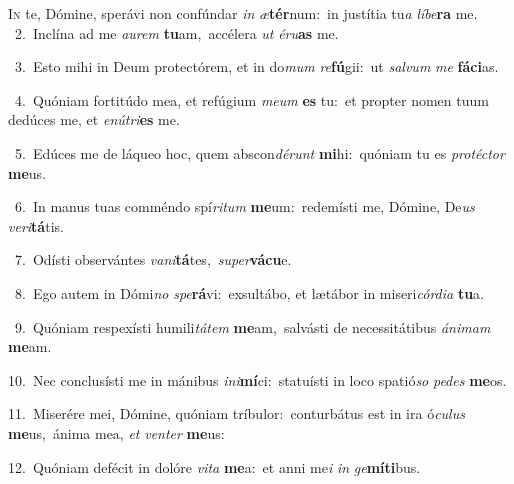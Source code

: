 \lettrine{\initial\textcolor{\initialcolor}{I}}{n} te, Dómine, sperávi non confúndar \textit{in} \textit{æ}\-\textbf{tér}num:~\star in justítia tu\textit{a} \textit{lí}\-\textit{be}\textbf{ra} me.\\
{\numbfont\textcolor{\numbcolor}{~2.}}~Inclína ad me \textit{au}\-\textit{rem} \textbf{tu}\-am,~\star accélera \textit{ut} \textit{é}\-\textit{ru}\textbf{as} me.\par
{\numbfont\textcolor{\numbcolor}{~3.}}~Esto mihi in Deum protectórem, et in do\textit{mum} \textit{re}\-\textbf{fú}gii:~\star ut \textit{sal}\-\textit{vum} \textit{me} \textbf{fá}\-\textbf{ci}as.\par
{\numbfont\textcolor{\numbcolor}{~4.}}~Quóniam fortitúdo mea, et refúgium \textit{me}\-\textit{um} \textbf{es} tu:~\star et propter nomen tuum dedúces me, et \textit{e}\-\textit{nú}\textit{tri}\textbf{es} me.\par
{\numbfont\textcolor{\numbcolor}{~5.}}~Edúces me de láqueo hoc, quem abscon\-\textit{dé}\-\textit{runt} \textbf{mi}\-hi:~\star quóniam tu es \textit{pro}\-\textit{téc}\textit{tor} \textbf{me}\-us.\par
{\numbfont\textcolor{\numbcolor}{~6.}}~In manus tuas comméndo spí\-\textit{ri}\-\textit{tum} \textbf{me}\-um:~\star redemísti me, Dómine, De\textit{us} \textit{ve}\-\textit{ri}\textbf{tá}tis.\par
{\numbfont\textcolor{\numbcolor}{~7.}}~Odísti observántes \textit{va}\-\textit{ni}\textbf{tá}tes,~\star \textit{su}\-\textit{per}\textbf{vá}\textbf{cu}e.\par
{\numbfont\textcolor{\numbcolor}{~8.}}~Ego autem in Dómi\textit{no} \textit{spe}\-\textbf{rá}vi:~\star exsultábo, et lætábor in miseri\-\textit{cór}\-\textit{di}\textit{a} \textbf{tu}\-a.\par
{\numbfont\textcolor{\numbcolor}{~9.}}~Quóniam respexísti humili\-\textit{tá}\-\textit{tem} \textbf{me}\-am,~\star salvásti de necessitátibus \textit{á}\-\textit{ni}\textit{mam} \textbf{me}\-am.\par
{\numbfont\textcolor{\numbcolor}{10.}}~Nec conclusísti me in mánibus \textit{in}\-\textit{i}\textbf{mí}ci:~\star statuísti in loco spatió\textit{so} \textit{pe}\-\textit{des} \textbf{me}\-os.\par
{\numbfont\textcolor{\numbcolor}{11.}}~Miserére mei, Dómine, quóniam tríbulor:~\dagger conturbátus est in ira ó\-\textit{cu}\-\textit{lus} \textbf{me}\-us,~\star ánima mea, \textit{et} \textit{ven}\-\textit{ter} \textbf{me}\-us:\par
{\numbfont\textcolor{\numbcolor}{12.}}~Quóniam defécit in dolóre \textit{vi}\-\textit{ta} \textbf{me}\-a:~\star et anni me\textit{i} \textit{in} \textit{ge}\-\textbf{mí}\textbf{ti}bus.\par
